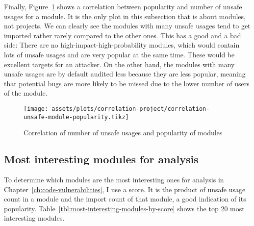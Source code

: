 Finally, Figure~\ref{fig:correlations-module-unsafe-popularity} shows a correlation between popularity and number of
unsafe usages for a module.
It is the only plot in this subsection that is about modules, not projects.
We can clearly see the modules with many unsafe usages tend to get imported rather rarely compared to the other ones.
This has a good and a bad side:
There are no high-impact-high-probability modules, which would contain lots of unsafe usages and are very popular at the
same time.
These would be excellent targets for an attacker.
On the other hand, the modules with many unsafe usages are by default audited less because they are less popular,
meaning that potential bugs are more likely to be missed due to the lower number of users of the module.

\begin{figure}[ht]
    \centering
    {\scriptsize \texttt{[image: assets/plots/correlation-project/correlation-unsafe-module-popularity.tikz]}}
    \caption{Correlation of number of unsafe usages and popularity of modules}
    \label{fig:correlations-module-unsafe-popularity}
\end{figure}



\subsection{Most interesting modules for analysis}\label{subsec:results-most-interesting-modules}

To determine which modules are the most interesting ones for analysis in Chapter~\ref{ch:code-vulnerabilities}, I use
a score.
It is the product of unsafe usage count in a module and the import count of that module, a good indication of its
popularity.
Table~\ref{tbl:most-interesting-modules-by-score} shows the top 20 most interesting modules.

